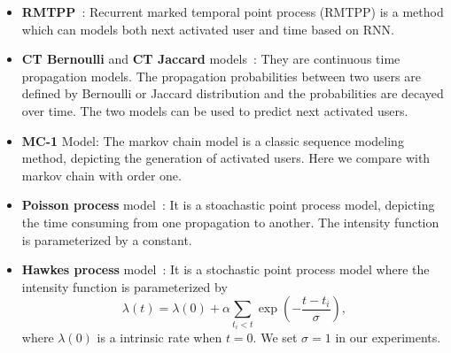 \begin{itemize}
  \item \textbf{RMTPP}~\cite{DuKDD2016}: Recurrent marked temporal point process
  (RMTPP) is a method which can models both next activated user and time based on RNN.
  \item \textbf{CT Bernoulli} and \textbf{CT Jaccard}
  models~\cite{goyal2010learning}: They are continuous time propagation models.
  The propagation probabilities between two users are defined by Bernoulli or
  Jaccard distribution and the probabilities are decayed over time. The two
  models can be used to predict next activated users.
  \item \textbf{MC-1} Model: The markov chain model is a classic sequence
  modeling method, depicting the generation of activated users. Here
  we compare with markov chain with order one.
  \item \textbf{Poisson process} model~\cite{vere1988introduction}: It is a
  stoachastic point process model, depicting the time consuming from one
  propagation to another. The intensity function is parameterized by a constant.
  \item \textbf{Hawkes process} model~\cite{hawkes1971spectra}: It is a
  stochastic point process model where the intensity function is parameterized by
  \begin{equation} 
  \label{eq:hawke_intens_func}
  \lambda(t)=\lambda(0)+\alpha\sum_{t_i<t}\exp\left(-\frac{t-t_i}{\sigma}\right),
  \end{equation}
   where $\lambda(0)$ is a intrinsic rate when $t=0$. We set $\sigma=1$ in our
   experiments.
\end{itemize}

